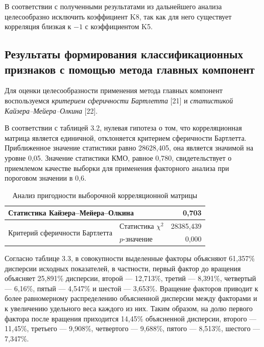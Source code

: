 \documentclass[14pt,a4paper]{extarticle}
\begin{document}
В соответствии с полученными результатами из дальнейшего анализа целесообразно исключить коэффициент K8, так как для него существует корреляция близкая к $-1$ с коэффициентом K5.

\subsection{Результаты формирования классификационных признаков с помощью метода главных компонент}

Для оценки целесообразности применения метода главных компонент воспользуемся \textit{критерием сферичности Бартлетта} [21] и \textit{статистикой Кайзера--Мейера--Олкина} [22].

В соответствии с таблицей 3.2, нулевая гипотеза о том, что корреляционная матрица является единичной, отклоняется критерием сферичности Бартлетта. Приближенное значение статистики равно 28628,405, она является значимой на уровне 0,05. Значение статистики КМО, равное 0,780, свидетельствует о приемлемом качестве выборки для применения факторного анализа при пороговом значении в 0,6.

\begin{table}[H]
    \centering
    \caption{Анализ пригодности выборочной корреляционной матрицы}
    \label{tab:kmo}
    \begin{tabular}{llr}
        \toprule
        \multicolumn{2}{l}{Статистика Кайзера--Мейера--Олкина} & 0,703 \\
        \midrule
        \multirow{2}{*}{Критерий сферичности Бартлетта} & Статистика $\chi^{2}$ & 28385,439 \\
        & $p$-значение & 0,000 \\
        \bottomrule
    \end{tabular}
\end{table}

Согласно таблице 3.3, в совокупности выделенные факторы объясняют 61,357\% дисперсии исходных показателей, в частности, первый фактор до вращения объясняет 25,891\% дисперсии, второй --- 12,713\%, третий --- 8,391\%, четвертый --- 6,16\%, пятый --- 4,547\% и шестой --- 3,653\%. Вращение факторов приводит к более равномерному распределению объясненной дисперсии между факторами и к увеличению удельного веса каждого из них. Таким образом, на долю первого фактора после вращения приходится 14,45\% объясненной дисперсии, второго --- 11,45\%, третьего --- 9,908\%, четвертого --- 9,688\%, пятого --- 8,513\%, шестого --- 7,347\%.
\end{document}
